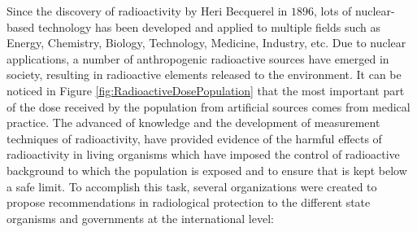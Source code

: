 Since the discovery of radioactivity by Heri Becquerel in $1896$, lots of nuclear-based technology has been developed and applied to multiple fields such as Energy, Chemistry, Biology, Technology, Medicine, Industry, etc. Due to nuclear applications, a number of anthropogenic radioactive sources have emerged in society, resulting in radioactive elements released to the environment. It can be noticed in Figure \ref{fig:RadioactiveDosePopulation} that the most important part of the dose received by the population from artificial sources comes from medical practice. The advanced of knowledge and the development of measurement techniques of radioactivity, have provided evidence of the harmful effects of radioactivity in living organisms which have imposed the control of radioactive background to which the population is exposed and to ensure that is kept below a safe limit. To accomplish this task, several organizations were created to propose recommendations in radiological protection to the different state organisms and governments at the international level:

